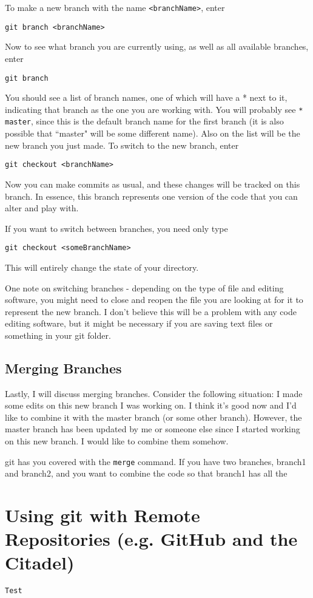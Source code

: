 \documentclass[11pt]{article}
\newcommand{\code}[1]{\quad \texttt{#1}}
\begin{document}
To make a new branch with the name \texttt{<branchName>}, enter

\code{git branch <branchName>}

Now to see what branch you are currently using, as well as all available branches, enter

\code{git branch}

You should see a list of branch names, one of which will have a * next to it, indicating that branch as the one you are working with.  You will probably see \texttt{* master}, since this is the default branch name for the first branch (it is also possible that ``master" will be some different name).  Also on the list will be the new branch you just made.  To switch to the new branch, enter

\code{git checkout <branchName>}

Now you can make commits as usual, and these changes will be tracked on this branch.  In essence, this branch represents one version of the code that you can alter and play with. 

If you want to switch between branches, you need only type

\code{git checkout <someBranchName>}

This will entirely change the state of your directory.  

One note on switching branches - depending on the type of file and editing software, you might need to close and reopen the file you are looking at for it to represent the new branch.  I don't believe this will be a problem with any code editing software, but it might be necessary if you are saving text files or something in your git folder.

\subsection{Merging Branches}

Lastly, I will discuss merging branches.  Consider the following situation:  I made some edits on this new branch I was working on.  I think it's good now and I'd like to combine it with the master branch (or some other branch).  However, the master branch has been updated by me or someone else since I started working on this new branch.  I would like to combine them somehow.

git has you covered with the \texttt{merge} command.  If you have two branches, branch1 and branch2, and you want to combine the code so that branch1 has all the 

\section{Using git with Remote Repositories (e.g. GitHub and the Citadel)}

\texttt{Test}
\end{document}
